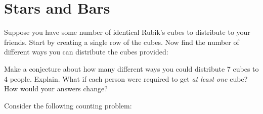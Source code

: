 \documentclass[12pt]{article}
\begin{document}
\section{Stars and Bars }\label{sec:stars-and-bars}

\begin{activity}

\begin{questions}
\question Suppose you have some number of identical Rubik's cubes to distribute to your friends.  Start by creating a single row of the cubes.  Now find the number of different ways you can distribute the cubes provided:
\question Make a conjecture about how many different ways you could distribute 7 cubes to 4 people.  Explain.
\question What if each person were required to get {\em at least one} cube?  How would your answers change?
\end{questions}

\end{activity}

Consider the following counting problem:
\end{document}
